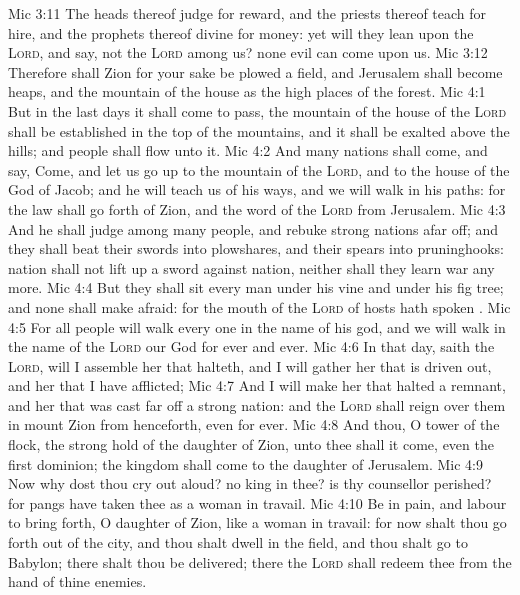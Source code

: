 \vs Mic 3:11 The heads thereof judge for reward, and the priests thereof teach for hire, and the prophets thereof divine for money: yet will they lean upon the \textsc{Lord}, and say,  not the \textsc{Lord} among us? none evil can come upon us.
\vs Mic 3:12 Therefore shall Zion for your sake be plowed  a field, and Jerusalem shall become heaps, and the mountain of the house as the high places of the forest.
\vs Mic 4:1 But in the last days it shall come to pass,  the mountain of the house of the \textsc{Lord} shall be established in the top of the mountains, and it shall be exalted above the hills; and people shall flow unto it.
\vs Mic 4:2 And many nations shall come, and say, Come, and let us go up to the mountain of the \textsc{Lord}, and to the house of the God of Jacob; and he will teach us of his ways, and we will walk in his paths: for the law shall go forth of Zion, and the word of the \textsc{Lord} from Jerusalem.
\vs Mic 4:3 And he shall judge among many people, and rebuke strong nations afar off; and they shall beat their swords into plowshares, and their spears into pruninghooks: nation shall not lift up a sword against nation, neither shall they learn war any more.
\vs Mic 4:4 But they shall sit every man under his vine and under his fig tree; and none shall make  afraid: for the mouth of the \textsc{Lord} of hosts hath spoken .
\vs Mic 4:5 For all people will walk every one in the name of his god, and we will walk in the name of the \textsc{Lord} our God for ever and ever.
\vs Mic 4:6 In that day, saith the \textsc{Lord}, will I assemble her that halteth, and I will gather her that is driven out, and her that I have afflicted;
\vs Mic 4:7 And I will make her that halted a remnant, and her that was cast far off a strong nation: and the \textsc{Lord} shall reign over them in mount Zion from henceforth, even for ever.
\vs Mic 4:8 And thou, O tower of the flock, the strong hold of the daughter of Zion, unto thee shall it come, even the first dominion; the kingdom shall come to the daughter of Jerusalem.
\vs Mic 4:9 Now why dost thou cry out aloud?  no king in thee? is thy counsellor perished? for pangs have taken thee as a woman in travail.
\vs Mic 4:10 Be in pain, and labour to bring forth, O daughter of Zion, like a woman in travail: for now shalt thou go forth out of the city, and thou shalt dwell in the field, and thou shalt go  to Babylon; there shalt thou be delivered; there the \textsc{Lord} shall redeem thee from the hand of thine enemies.
